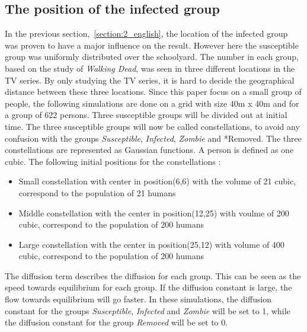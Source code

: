 \documentclass[%
twoside,                 %
final,                   %
chapterprefix=true,      %
open=right               %
10pt]{book}
\begin{document}
\subsection{The position of the infected group}
In the previous section,~\ref{section:2_english}, the location of the infected group was proven to have a major influence on the result. However here the susceptible group was uniformly distributed over the schoolyard. The number in each group, based on the study of \emph{Walking Dead}, was seen in three different locations in the TV series. By only studying the TV series, it is hard to decide the geographical distance between these three locations. Since this paper focus on a small group of people, the following simulations are done on a grid with size 40m x 40m and for a group of 622 persons. Three susceptible groups will be divided out at initial time. The three susceptible groups will now be called constellations, to avoid any confusion with the groups \emph{Susceptible}, \emph{Infected}, \emph{Zombie} and *Removed. The three constellations are represented as Gaussian functions. A person is defined as one cubic. The following initial positions for the constellations : 
\begin{itemize}
\item Small constellation with center in position(6,6) with the volume of 21 cubic, correspond to the population of 21 humans 

\item Middle constellation with the center in position(12,25) with voulme of 200 cubic, correspond to the population of 200 humans

\item Large constellation with the center in position(25,12) with volume of 400 cubic, correspond to the population of 200 humans
\end{itemize}

\noindent
The diffusion term describes the diffusion for each group. This can be seen as the speed towards equilibrium for each group. If the diffusion constant is large, the flow towards equilibrium will go faster. In these simulations, the diffusion constant for the groups \emph{Susceptible}, \emph{Infected} and \emph{Zombie} will be set to 1, while the diffusion constant for the group \emph{Removed} will be set to 0. 


\vspace{3mm}




\vspace{3mm}
\end{document}
